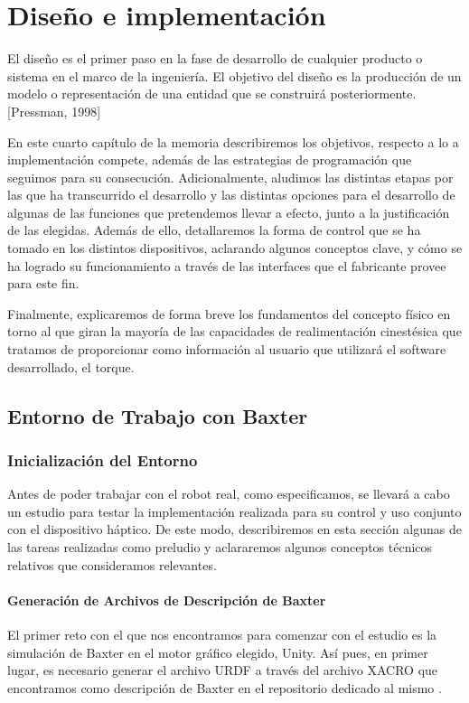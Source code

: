 \chapter{Diseño e implementación}
El diseño es el primer paso en la fase de desarrollo de cualquier producto o sistema en el marco de la ingeniería. El objetivo del diseño es la producción de un modelo o representación de una entidad que se construirá posteriormente. [Pressman, 1998]

En este cuarto capítulo de la memoria describiremos los objetivos, respecto a lo a implementación compete, además de las estrategias de programación que seguimos para su consecución. Adicionalmente, aludimos las distintas etapas por las que ha transcurrido el desarrollo y las distintas opciones para el desarrollo de algunas de las funciones que pretendemos llevar a efecto, junto a la justificación de las elegidas. Además de ello, detallaremos la forma de control que se ha tomado en los distintos dispositivos, aclarando algunos conceptos clave, y cómo se ha logrado su funcionamiento a través de las interfaces que el fabricante provee para este fin.

Finalmente, explicaremos de forma breve los fundamentos del concepto físico en torno al que giran la mayoría de las capacidades de realimentación cinestésica que tratamos de proporcionar como información al usuario que utilizará el software desarrollado, el torque.

\bigskip
\bigskip
\bigskip
\bigskip
\bigskip
\bigskip
\bigskip
\bigskip


\section{Entorno de Trabajo con Baxter}

\subsection{Inicialización del Entorno}
Antes de poder trabajar con el robot real, como especificamos, se llevará a cabo un estudio para testar la implementación realizada para su control y uso conjunto con el dispositivo háptico. De este modo, describiremos en esta sección algunas de las tareas realizadas como preludio y aclararemos algunos conceptos técnicos relativos que consideramos relevantes.

\subsubsection{Generación de Archivos de Descripción de Baxter}
El primer reto con el que nos encontramos para comenzar con el estudio es la simulación de Baxter en el motor gráfico elegido, Unity. Así pues, en primer lugar, es necesario generar el archivo URDF a través del archivo XACRO que encontramos como descripción de Baxter en el repositorio dedicado al mismo \cite{64}.


